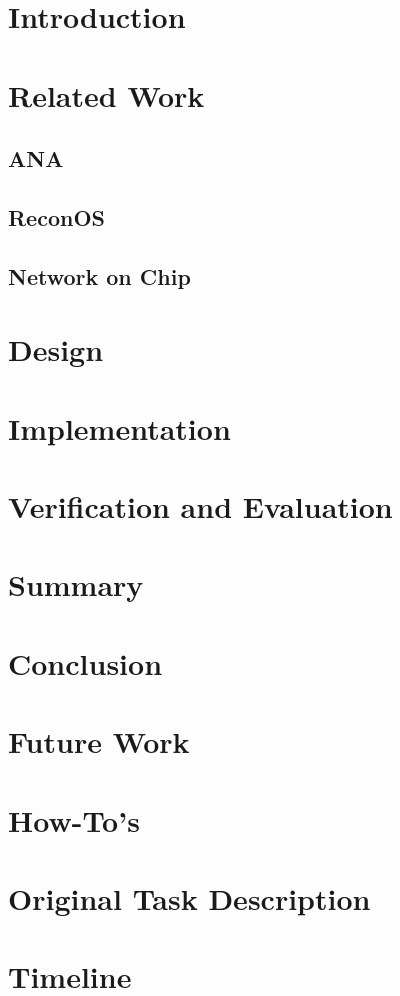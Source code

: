 \documentclass[10pt,final,a4paper,twoside]{book}
\begin{document}
\tableofcontents


\chapter{Introduction}

\chapter{Related Work}
\section{ANA}
\section{ReconOS}
\section{Network on Chip}

\chapter{Design}

\chapter{Implementation}

\chapter{Verification and Evaluation}

\chapter{Summary}

\chapter{Conclusion}

\chapter{Future Work}

\appendix
\chapter{How-To's}
\chapter{Original Task Description}
\chapter{Timeline}
\end{document}
